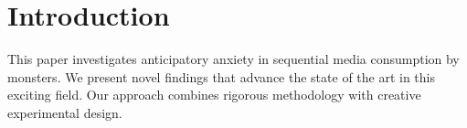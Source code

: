 \section{Introduction}

This paper investigates anticipatory anxiety in sequential media consumption by monsters. We present novel findings that advance the state of the art in this exciting field. Our approach combines rigorous methodology with creative experimental design.
